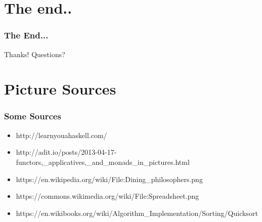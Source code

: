 \documentclass[12pt, xcolor=table]{beamer}
\begin{document}
\section{The end..} %
\begin{frame}
    \frametitle{The End...}
    \begin{block}{Thanks!}
        Questions?
    \end{block}
\end{frame}

\section{Picture Sources}
\begin{frame}
    \frametitle{Some Sources}
    \begin{itemize}
        \item \tiny{http://learnyouahaskell.com/}
        \item \tiny{http://adit.io/posts/2013-04-17-functors,\_applicatives,\_and\_monads\_in\_pictures.html}
        \item \tiny{https://en.wikipedia.org/wiki/File:Dining\_philosophers.png}
        \item \tiny{https://commons.wikimedia.org/wiki/File:Spreadsheet.png}
        \item \tiny{https://en.wikibooks.org/wiki/Algorithm\_Implementation/Sorting/Quicksort}
    \end{itemize}
\end{frame}
\end{document}
